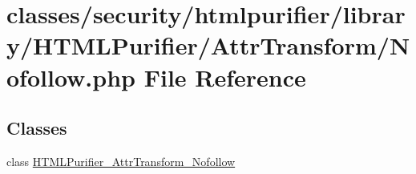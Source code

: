 \hypertarget{AttrTransform_2Nofollow_8php}{\section{classes/security/htmlpurifier/library/\+H\+T\+M\+L\+Purifier/\+Attr\+Transform/\+Nofollow.php File Reference}
\label{AttrTransform_2Nofollow_8php}
}
\subsection*{Classes}
\begin{DoxyCompactItemize}
\item 
class \hyperlink{classHTMLPurifier__AttrTransform__Nofollow}{H\+T\+M\+L\+Purifier\+\_\+\+Attr\+Transform\+\_\+\+Nofollow}
\end{DoxyCompactItemize}
